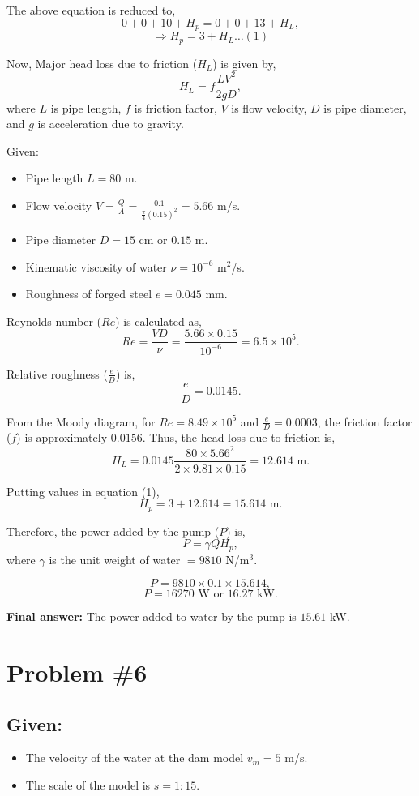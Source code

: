 \documentclass{article}
\begin{document}
The above equation is reduced to,
\[ 0 + 0 + 10 + H_p = 0 + 0 + 13 + H_L, \]
\[ \Rightarrow H_p = 3 + H_L \dots (1) \]

Now, Major head loss due to friction ($H_L$) is given by,
\[ H_L = f \frac{L V^2}{2gD}, \]
where $L$ is pipe length, $f$ is friction factor, $V$ is flow velocity, $D$ is pipe diameter, and $g$ is acceleration due to gravity.

Given:
\begin{itemize}
    \item Pipe length $L = 80$ m.
    \item Flow velocity $V = \frac{Q}{A} = \frac{0.1}{\frac{\pi}{4}(0.15)^2} = 5.66$ m/s.
    \item Pipe diameter $D = 15$ cm or $0.15$ m.
    \item Kinematic viscosity of water $\nu = 10^{-6}$ m$^2$/s.
    \item Roughness of forged steel $e = 0.045$ mm.
\end{itemize}

Reynolds number ($Re$) is calculated as,
\[ Re = \frac{VD}{\nu} = \frac{5.66 \times 0.15}{10^{-6}} = 6.5 \times 10^5. \]

Relative roughness ($\frac{e}{D}$) is,
\[ \frac{e}{D} = 0.0145. \]

From the Moody diagram, for $Re = 8.49 \times 10^5$ and $\frac{e}{D} = 0.0003$, the friction factor ($f$) is approximately $0.0156$. Thus, the head loss due to friction is,
\[ H_L = 0.0145 \frac{80 \times 5.66^2}{2 \times 9.81 \times 0.15} = 12.614 \text{ m}. \]

Putting values in equation (1),
\[ H_p = 3 + 12.614 = 15.614 \text{ m}. \]

Therefore, the power added by the pump ($P$) is,
\[ P = \gamma Q H_p, \]
where $\gamma$ is the unit weight of water $= 9810$ N/m$^3$.

\[ P = 9810 \times 0.1 \times 15.614, \]
\[ P = 16270 \text{ W} \text{ or } 16.27 \text{ kW}. \]

\textbf{Final answer:}
The power added to water by the pump is $15.61$ kW.

\newpage
\section*{Problem \#6}

\subsection*{Given:}
\begin{itemize}
    \item The velocity of the water at the dam model \( v_m = 5 \) m/s.
    \item The scale of the model is \( s = 1:15 \).
\end{itemize}
\end{document}
